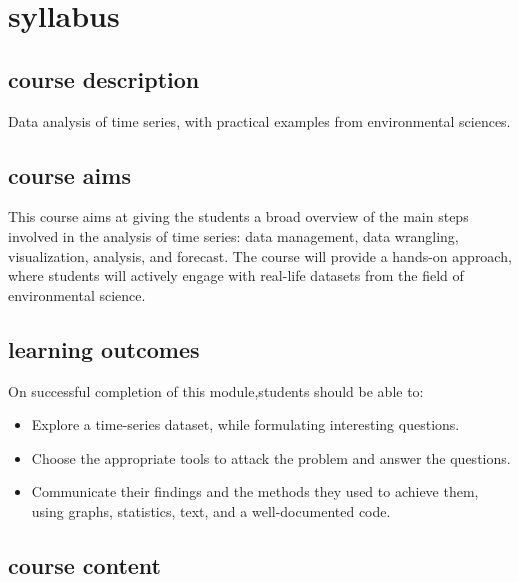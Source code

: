 \documentclass[
  letterpaper,
  DIV=11,
  numbers=noendperiod]{scrreprt}
\providecommand{\tightlist}{%
  \setlength{\itemsep}{0pt}\setlength{\parskip}{0pt}}\usepackage{longtable,booktabs,array}
\begin{document}
\section*{syllabus}\label{syllabus}


\subsection*{course description}\label{course-description}

Data analysis of time series, with practical examples from environmental
sciences.

\subsection*{course aims}\label{course-aims}

This course aims at giving the students a broad overview of the main
steps involved in the analysis of time series: data management, data
wrangling, visualization, analysis, and forecast. The course will
provide a hands-on approach, where students will actively engage with
real-life datasets from the field of environmental science.

\subsection*{learning outcomes}\label{learning-outcomes}

On successful completion of this module,students should be able to:

\begin{itemize}
\tightlist
\item
  Explore a time-series dataset, while formulating interesting
  questions.
\item
  Choose the appropriate tools to attack the problem and answer the
  questions.
\item
  Communicate their findings and the methods they used to achieve them,
  using graphs, statistics, text, and a well-documented code.
\end{itemize}

\subsection*{course content}\label{course-content}
\end{document}
